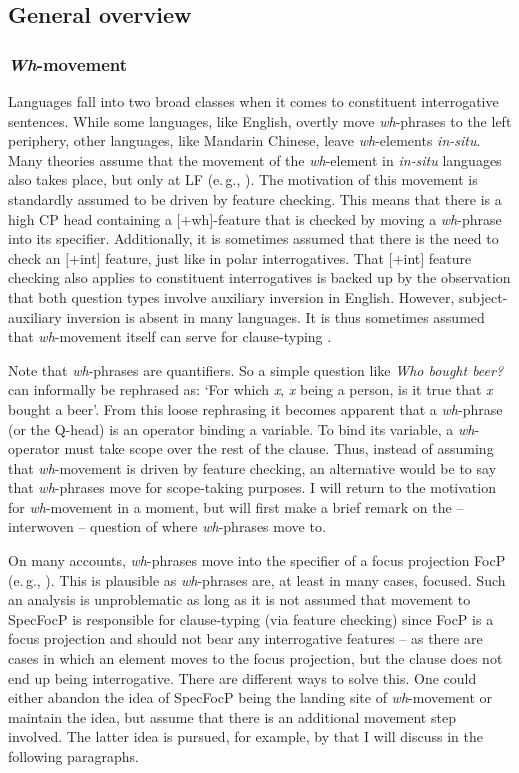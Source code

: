 \subsection{General overview}\label{whgeneral}
\subsubsection{\textit{Wh}-movement}
Languages fall into two broad classes when it comes to constituent interrogative sentences. While some languages, like English, overtly move \textit{wh}-phrases to the left periphery, other languages, like Mandarin Chinese, leave \textit{wh}-elements \textit{in-situ}. Many theories assume that the movement of the \textit{wh}-element in \textit{in-situ} languages also takes place, but only at LF (e.\,g., \citealt{rizzi1990relativized,cheng1997typology}). The motivation of this movement is standardly assumed to be driven by feature checking. This means that there is a high CP head containing a $[+$wh$]$-feature that is checked by moving a \textit{wh}-phrase into its specifier. Additionally, it is sometimes assumed that there is the need to check an $[+$int$]$ feature, just like in polar interrogatives. That $[+$int$]$ feature checking also applies to constituent interrogatives is backed up by the observation that both question types involve auxiliary inversion in English. However, subject-auxiliary inversion is absent in many languages. It is thus sometimes assumed that \textit{wh}-movement itself can serve for clause-typing \citep{cheng1997typology}. 

Note that \textit{wh}-phrases are quantifiers. So a simple question like \textit{Who bought beer?} can informally be rephrased as: `For which \textit{x}, \textit{x} being a person, is it true that \textit{x} bought a beer'. From this loose rephrasing it becomes apparent that a \textit{wh}-phrase (or the Q-head) is an operator binding a variable. To bind its variable, a \textit{wh}-operator must take scope over the rest of the clause. Thus, instead of assuming that \textit{wh}-movement is driven by feature checking, an alternative would be to say that \textit{wh}-phrases move for scope-taking purposes. I will return to the motivation for \textit{wh}-movement in a moment, but will first make a brief remark on the -- interwoven -- question of where \textit{wh}-phrases move to. 

\label{abohpfaua}
On many accounts, \textit{wh}-phrases move into the specifier of a focus projection FocP (e.\,g., \citealt{rizzi2001position}). This is plausible as \textit{wh}-phrases are, at least in many cases, focused. Such an analysis is unproblematic as long as it is not assumed that movement to SpecFocP is responsible for clause-typing (via feature checking) since FocP is a focus projection and should not bear any interrogative features -- as there are cases in which an element moves to the focus projection, but the clause does not end up being interrogative. There are different ways to solve this. One could either abandon the idea of SpecFocP being the landing site of \textit{wh}-movement or maintain the idea, but assume that there is an additional movement step involved. The latter idea is pursued, for example, by \citet{aboh2010sa} that I will discuss in the following paragraphs.

